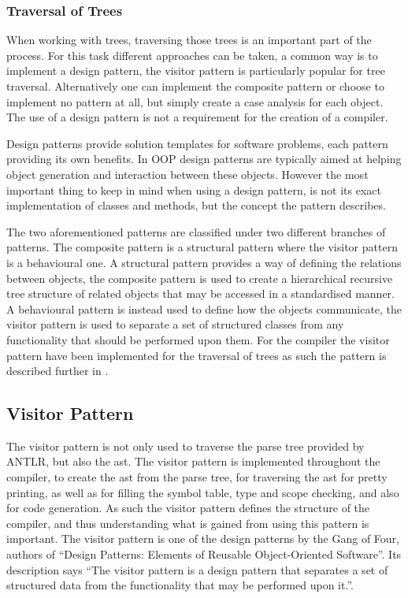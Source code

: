\subsubsection*{Traversal of Trees}
When working with trees, traversing those trees is an important part of the process.
For this task different approaches can be taken, a common way is to implement a design pattern, the visitor pattern is particularly popular for tree traversal.
Alternatively one can implement the composite pattern or choose to implement no pattern at all, but simply create a case analysis for each object.
The use of a design pattern is not a requirement for the creation of a compiler.

Design patterns provide solution templates for software problems, each pattern providing its own benefits.
In OOP design patterns are typically aimed at helping object generation and interaction between these objects.
However the most important thing to keep in mind when using a design pattern, is not its exact implementation of classes and methods, but the concept the pattern describes.

The two aforementioned patterns are classified under two different branches of patterns.
The composite pattern is a structural pattern where the visitor pattern is a behavioural one.
A structural pattern provides a way of defining the relations between objects, the composite pattern is used to create a hierarchical recursive tree structure of related objects that may be accessed in a standardised manner.
A behavioural pattern is instead used to define how the objects communicate, the visitor pattern is used to separate a set of structured classes from any functionality that should be performed upon them.
For the compiler the visitor pattern have been implemented for the traversal of trees as such the pattern is described further in .  

\subsection*{Visitor Pattern}\label{subs:visit}
The visitor pattern is not only used to traverse the parse tree provided by ANTLR, but also the \acrfull{ast}.
The visitor pattern is implemented throughout the compiler, to create the \acrfull{ast} from the parse tree, for traversing the \acrfull{ast} for pretty printing, as well as for filling the symbol table, type and scope checking, and also for code generation.
As such the visitor pattern defines the structure of the compiler, and thus understanding what is gained from using this pattern is important.
The visitor pattern is one of the design patterns by the Gang of Four, authors of ``Design Patterns: Elements of Reusable Object-Oriented Software''.
Its description says ``The visitor pattern is a design pattern that separates a set of structured data from the functionality that may be performed upon it.''. \citep{GOF}

